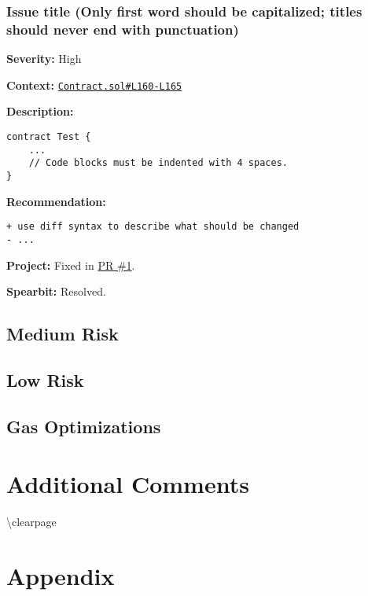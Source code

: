 \subsubsection{Issue title (Only first word should be capitalized;
titles should never end with
punctuation)}\label{issue-title-only-first-word-should-be-capitalized-titles-should-never-end-with-punctuation}

\textbf{Severity:} High

\textbf{Context:}
\href{https://github.com/actuallink}{\texttt{Contract.sol\#L160-L165}}

\textbf{Description:}

\begin{verbatim}
contract Test {
    ...
    // Code blocks must be indented with 4 spaces.
}
\end{verbatim}

\textbf{Recommendation:}

\begin{verbatim}
+ use diff syntax to describe what should be changed
- ...
\end{verbatim}

\textbf{Project:} Fixed in \href{Https://github.com/actuallink}{PR \#1}.

\textbf{Spearbit:} Resolved.

\subsection{Medium Risk}\label{medium-risk}

\subsection{Low Risk}\label{low-risk}

\subsection{Gas Optimizations}\label{gas-optimizations}

\section{Additional Comments}\label{additional-comments}

\textbackslash clearpage

\section{Appendix}\label{appendix}
